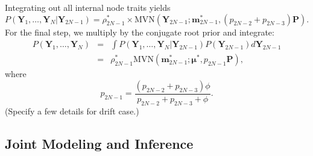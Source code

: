 \documentclass[12pt]{article}
\begin{document}
\par
Integrating out all internal node traits yields 
\begin{equation*}
P(\textbf{Y}_1,\dots,\textbf{Y}_N | \textbf{Y}_{2N-1}) = \rho^*_{2N-1} \times \mbox{MVN} (\textbf{Y}_{2N-1};\textbf{m}^*_{2N-1},
(p_{2N-2}+p_{2N-3})\textbf{P}) .  
\end{equation*}
For the 
final step, we multiply by the conjugate root prior and integrate:
\begin{eqnarray}
P(\textbf{Y}_1,\dots,\textbf{Y}_N) & = & \int P(\textbf{Y}_1,\dots,\textbf{Y}_N | \textbf{Y}_{2N-1}) P(\textbf{Y}_{2N-1}) d \textbf{Y}_{2N-1} \\
& = &  \rho^*_{2N-1}  \mbox{MVN} (\textbf{m}^*_{2N-1};\boldsymbol \mu^*, p_{2N-1} \textbf{P}),
\end{eqnarray}
where
\begin{equation}
p_{2N-1} = \frac{(p_{2N-2}+p_{2N-3})\phi}{p_{2N-2}+p_{2N-3} +\phi}.
\end{equation}
(Specify a few details for drift case.)  



\subsection{Joint Modeling and Inference}
\end{document}
